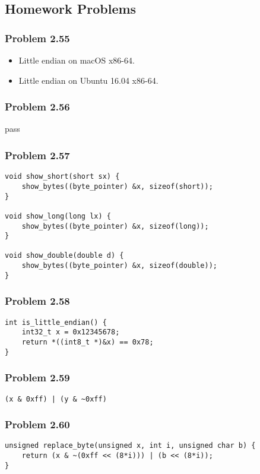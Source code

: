 \documentclass[a4paper]{article}
\newcommand{\wav}{\textasciitilde}
\begin{document}
\subsection*{Homework Problems}
\subsubsection*{Problem 2.55}
\begin{itemize}
    \item Little endian on macOS x86-64.
    \item Little endian on Ubuntu 16.04 x86-64.
\end{itemize}

\subsubsection*{Problem 2.56}
pass

\subsubsection*{Problem 2.57}
\begin{lstlisting}
void show_short(short sx) {
    show_bytes((byte_pointer) &x, sizeof(short));
}

void show_long(long lx) {
    show_bytes((byte_pointer) &x, sizeof(long));
}

void show_double(double d) {
    show_bytes((byte_pointer) &x, sizeof(double));
}
\end{lstlisting}

\subsubsection*{Problem 2.58}
\begin{lstlisting}
int is_little_endian() {
    int32_t x = 0x12345678;
    return *((int8_t *)&x) == 0x78;
}
\end{lstlisting}

\subsubsection*{Problem 2.59}
\tt{(x \& 0xff) | (y \& \wav0xff)}

\subsubsection*{Problem 2.60}
\begin{lstlisting}
unsigned replace_byte(unsigned x, int i, unsigned char b) {
    return (x & ~(0xff << (8*i))) | (b << (8*i));
}
\end{lstlisting}
\end{document}
